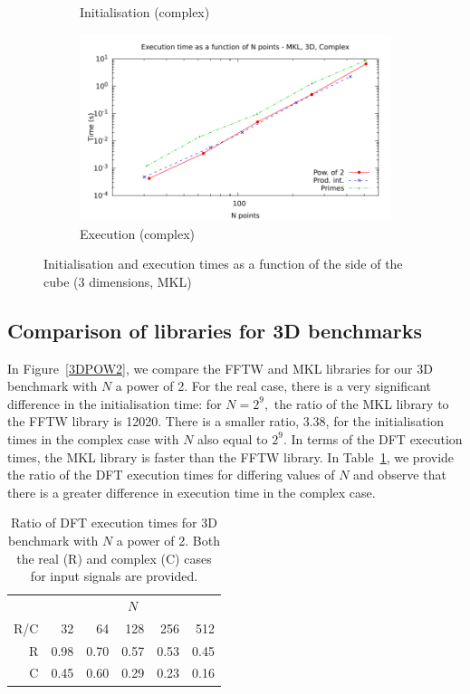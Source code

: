 \documentclass[12pt, a4paper]{article} \setlength{\textheight}{24cm}
\begin{document}
\begin{figure}[H]
\begin{subfigure}{.5\textwidth}
    \caption{Initialisation (complex)}
    \label{3DMKLCI}
  \end{subfigure}%
  \begin{subfigure}{.5\textwidth}
    \centering
    \includegraphics[width=.9\linewidth]{graphs/3d-mkl-exec-c.pdf}
    \caption{Execution (complex)}
    \label{3DMKLC}
  \end{subfigure}
  \caption{Initialisation and execution times as a function of the
    side of the cube (3 dimensions, MKL)}
  \label{3DMKL}
\end{figure}

\subsection{Comparison of libraries for 3D benchmarks}

In Figure~\ref{3DPOW2}, we compare the FFTW and MKL libraries for our
3D benchmark with $N$ a power of 2. For the real case, there is a very
significant difference in the initialisation time: for $N=2^9,$ the
ratio of the MKL library to the FFTW library is 12020. There is a
smaller ratio, 3.38, for the initialisation times in the complex case
with $N$ also equal to $2^9.$ In terms of the DFT execution times, the
MKL library is faster than the FFTW library. In
Table~\ref{Tbl:3DPOW2}, we provide the ratio of the DFT execution
times for differing values of $N$ and observe that there is a greater
difference in execution time in the complex case.

\begin{table}[H]
  \centering
  \begin{tabular}{|r|rrrrr|}
    \hline
    & \multicolumn{5}{|c|}{$N$ }   \\
    R/C & 32 & 64 & 128 & 256 & 512 \\
    \hline
    R & 0.98 & 0.70 & 0.57 & 0.53 & 0.45 \\
    C & 0.45 & 0.60 & 0.29 & 0.23 & 0.16 \\
    \hline
  \end{tabular}
  \caption{Ratio of DFT execution times for 3D benchmark with $N$ a power of 2. Both the real (R) and complex (C) cases for input signals are provided.}\label{Tbl:3DPOW2}
\end{table}
\end{document}
